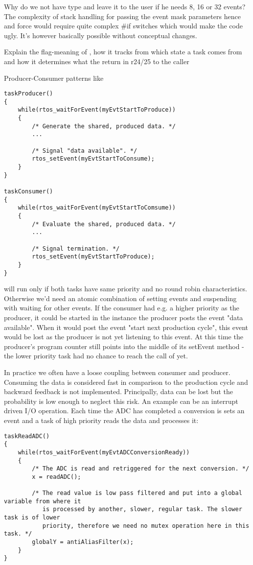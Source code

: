 Why do we not have type  and leave it to the user if he needs
8, 16 or 32 events? The complexity of stack handling for passing the event
mask parameters hence and force would require quite complex \#if switches
which would make the code ugly. It's however basically possible without
conceptual changes.

Explain the flag-meaning of , how it tracks from which
state a task comes from and how it determines what the return in r24/25 to
the caller

Producer-Consumer patterns like
\begin{lstlisting}[float, caption={Deadlock situation in a producer/consumer implementation},
label=lstProducerConsumer, captionpos=b]
taskProducer()
{
    while(rtos_waitForEvent(myEvtStartToProduce))
    {
        /* Generate the shared, produced data. */
        ...

        /* Signal "data available". */
        rtos_setEvent(myEvtStartToConsume);
    }
}

taskConsumer()
{
    while(rtos_waitForEvent(myEvtStartToComsume))
    {
        /* Evaluate the shared, produced data. */
        ...

        /* Signal termination. */
        rtos_setEvent(myEvtStartToProduce);
    }
}
\end{lstlisting}
will run only if both tasks have same priority and no round robin characteristics.
Otherwise we'd need an atomic combination of setting events and suspending with waiting for
other events. If the consumer had e.g. a higher priority as the producer, it could be
started in the instance the producer posts the event "data available". When it would post
the event "start next production cycle", this event would be lost as the producer is not
yet listening to this event. At this time the producer's program counter still points into
the middle of its setEvent method - the lower priority task had no chance to reach the call
of  yet.

In practice we often have a loose coupling between consumer and producer. Consuming the
data is considered fast in comparison to the production cycle and backward feedback is not
implemented. Principally, data can be lost but the probability is low enough to neglect
this risk. An example can be an interrupt driven I/O operation. Each time the ADC has
completed a conversion is sets an event and a task of high priority reads the data and
processes it:
\begin{lstlisting}[float, caption=Usage of application interrupts,
label=lstSampleISRForADC, captionpos=b]
taskReadADC()
{
    while(rtos_waitForEvent(myEvtADCConversionReady))
    {
        /* The ADC is read and retriggered for the next conversion. */
        x = readADC();
        
        /* The read value is low pass filtered and put into a global variable from where it
           is processed by another, slower, regular task. The slower task is of lower
           priority, therefore we need no mutex operation here in this task. */
        globalY = antiAliasFilter(x);
    }        
}
\end{lstlisting}


